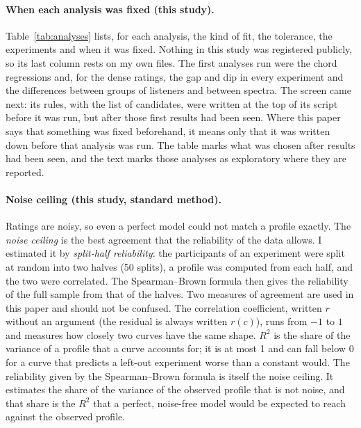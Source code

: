 \documentclass[11pt,a4paper]{article}
\begin{document}
\paragraph{When each analysis was fixed (this study).}
Table~\ref{tab:analyses} lists, for each analysis, the kind of fit, the tolerance, the
experiments and when it was fixed. Nothing in this study was registered publicly, so its last
column rests on my own files. The first analyses run were the chord regressions and, for the
dense ratings, the gap and dip in every experiment and the differences between groups of
listeners and between spectra. The screen
came next: its rules, with the list of candidates, were written at the top of its script
before it was run, but after those first results had been seen. Where this paper says that
something was fixed beforehand, it means only that it was written down before that analysis
was run. The table marks what was chosen after results had been seen, and the text marks those
analyses as exploratory where they are reported.

\paragraph{Noise ceiling (this study, standard method).}
Ratings are noisy, so even a perfect model could not match a profile exactly. The
\emph{noise ceiling} is the best agreement that the reliability of the data allows. I
estimated it by \emph{split-half reliability}: the participants of an experiment were split
at random into two halves (50 splits), a profile was computed from each half, and the two
were correlated. The Spearman--Brown formula \citep{spearman1910,brown1910} then gives the
reliability of the full sample from that of the halves. Two measures of agreement are used
in this paper and should not be confused. The correlation coefficient, written $r$ without an argument (the residual is always written
$r(c)$), runs from $-1$ to $1$ and measures how closely two curves have the same shape. $R^2$ is the share of the variance of
a profile that a curve accounts for; it is at most 1 and can fall below 0 for a curve that
predicts a left-out experiment worse than a constant would. The reliability given by the
Spearman--Brown formula is itself the noise ceiling. It estimates the share of the variance of the
observed profile that is not noise, and that share is the $R^2$ that a perfect, noise-free
model would be expected to reach against the observed profile.
\end{document}
